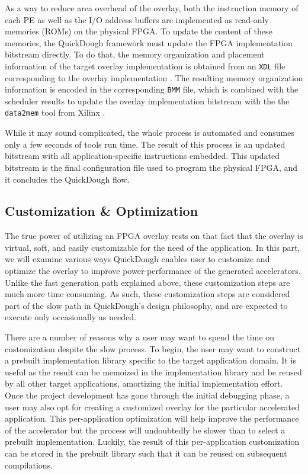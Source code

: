 As a way to reduce area overhead of the overlay, both the instruction memory of each PE as well as the I/O address buffers are implemented as read-only memories (ROMs) on the physical FPGA.
To update the content of these memories, the QuickDough framework must update the FPGA implementation bitstream directly.
%
To do that, the memory organization and placement information of the target overlay implementation is obtained from an \texttt{XDL} file corresponding to the overlay implementation \cite{beckhoff2011xilinx}.
The resulting memory organization information is encoded in the corresponding \texttt{BMM} file, which is combined with the scheduler results to update the overlay implementation bitstream with the the \texttt{data2mem} tool from Xilinx \cite{data2mem}.

While it may sound complicated, the whole process is automated and consumes only a few seconds of tools run time.
The result of this process is an updated bitstream with all application-specific instructions embedded.
This updated bitstream is the final configuration file used to program the physical FPGA, and it concludes the QuickDough flow.


\subsection{Customization \& Optimization}
The true power of utilizing an FPGA overlay rests on that fact that the overlay is virtual, soft, and easily customizable for the need of the application.
In this part, we will examine various ways QuickDough enables user to customize and optimize the overlay to improve power-performance of the generated accelerators.
Unlike the fast generation path explained above, these customization steps are much more time consuming.
As such, these customization steps are considered part of the slow path in QuickDough's design philosophy, and are expected to execute only occasionally as needed.

There are a number of reasons why a user may want to spend the time on customization despite the slow process.
To begin, the user may want to construct a prebuilt implementation library specific to the target application domain. 
It is useful as the result can be memoized in the implementation library and be reused by all other target applications, amortizing the initial implementation effort.
Once the project development has gone through the initial debugging phase, a user may also opt for creating a customized overlay for the particular accelerated application.
This per-application optimization will help improve the performance of the accelerator but the process will undoubtedly be slower than to select a prebuilt implementation.
Luckily, the result of this per-application customization can be stored in the prebuilt library such that it can be reused on subsequent compilations.

